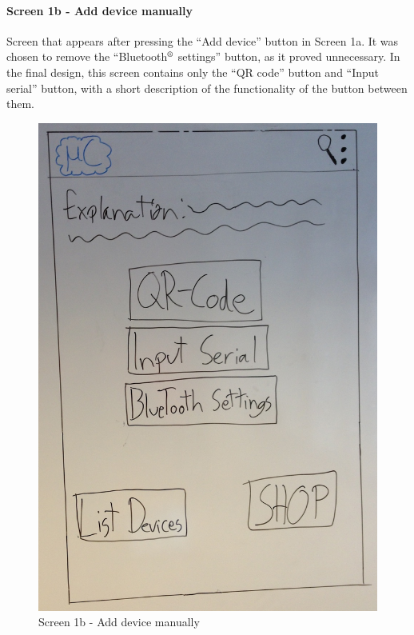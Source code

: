 \paragraph{Screen 1b - Add device manually}
Screen that appears after pressing the ``Add device'' button in Screen 1a. It was chosen to remove the ``Bluetooth$\textsuperscript{\textregistered}$ settings'' button, as it proved unnecessary. In the final design, this screen contains only the ``QR code'' button and ``Input serial'' button, with a short description of the functionality of the button between them.

\begin{figure}[H]
	\centering
		\includegraphics[scale=0.2]{images/Design_guide/Screen1b.png}
	\caption{Screen 1b - Add device manually}
	\label{fig:screen1b}
\end{figure}


